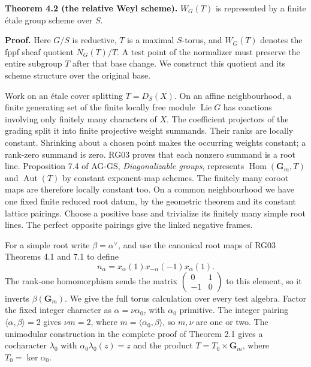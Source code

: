 \documentclass[11pt,a4paper,openany]{report}
\begin{document}
\textbf{Theorem 4.2 (the relative Weyl scheme).} \(W_G(T)\) is represented by a finite étale group scheme over \(S\).

\textbf{Proof.} Here \(G/S\) is reductive, \(T\) is a maximal \(S\)-torus, and \(W_G(T)\) denotes the fppf sheaf quotient \(N_G(T)/T\). A test point of the normalizer must preserve the entire subgroup \(T\) after that base change. We construct this quotient and its scheme structure over the original base.

Work on an étale cover splitting \(T=D_S(X)\). On an affine neighbourhood, a finite generating set of the finite locally free module \(\operatorname{Lie}G\) has coactions involving only finitely many characters of \(X\). The coefficient projectors of the grading split it into finite projective weight summands. Their ranks are locally constant. Shrinking about a chosen point makes the occurring weights constant; a rank-zero summand is zero. RG03 proves that each nonzero summand is a root line. Proposition 7.4 of AG-GS, \emph{Diagonalizable groups}, represents \(\operatorname{Hom}(\mathbf G_m,T)\) and \(\operatorname{Aut}(T)\) by constant exponent-map schemes. The finitely many coroot maps are therefore locally constant too. On a common neighbourhood we have one fixed finite reduced root datum, by the geometric theorem and its constant lattice pairings. Choose a positive base and trivialize its finitely many simple root lines. The perfect opposite pairings give the linked negative frames.

For a simple root write \(\beta=\alpha^\vee\), and use the canonical root maps of RG03 Theorems 4.1 and 7.1 to define \[
          n_\alpha=x_\alpha(1)x_{-\alpha}(-1)x_\alpha(1).
\] The rank-one homomorphism sends the matrix \(\left(\begin{smallmatrix}0&1\\-1&0\end{smallmatrix}\right)\) to this element, so it inverts \(\beta(\mathbf G_m)\). We give the full torus calculation over every test algebra. Factor the fixed integer character as \(\alpha=\nu\alpha_0\), with \(\alpha_0\) primitive. The integer pairing \(\langle\alpha,\beta\rangle=2\) gives \(\nu m=2\), where \(m=\langle\alpha_0,\beta\rangle\), so \(m,\nu\) are one or two. The unimodular construction in the complete proof of Theorem 2.1 gives a cocharacter \(\lambda_0\) with \(\alpha_0\lambda_0(z)=z\) and the product \(T=T_0\times\mathbf G_m\), where \(T_0=\ker\alpha_0\).
\end{document}
